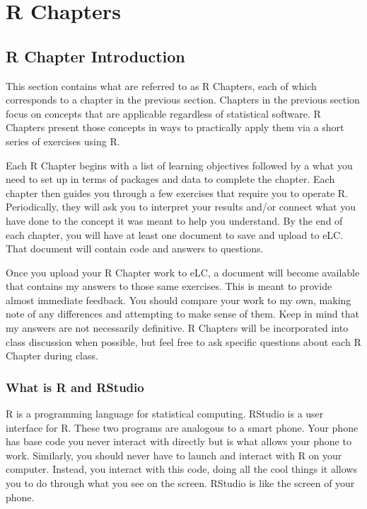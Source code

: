 \documentclass[
]{book}
\begin{document}
\hypertarget{part-r-chapters}{%
\part{R Chapters}\label{part-r-chapters}}

\hypertarget{r-chapter-introduction}{%
\chapter{R Chapter Introduction}\label{r-chapter-introduction}}

This section contains what are referred to as R Chapters, each of which corresponds to a chapter in the previous section. Chapters in the previous section focus on concepts that are applicable regardless of statistical software. R Chapters present those concepts in ways to practically apply them via a short series of exercises using R.

Each R Chapter begins with a list of learning objectives followed by a what you need to set up in terms of packages and data to complete the chapter. Each chapter then guides you through a few exercises that require you to operate R. Periodically, they will ask you to interpret your results and/or connect what you have done to the concept it was meant to help you understand. By the end of each chapter, you will have at least one document to save and upload to eLC. That document will contain code and answers to questions.

Once you upload your R Chapter work to eLC, a document will become available that contains my answers to those same exercises. This is meant to provide almost immediate feedback. You should compare your work to my own, making note of any differences and attempting to make sense of them. Keep in mind that my answers are not necessarily definitive. R Chapters will be incorporated into class discussion when possible, but feel free to ask specific questions about each R Chapter during class.

\hypertarget{what-is-r-and-rstudio}{%
\section{What is R and RStudio}\label{what-is-r-and-rstudio}}

R is a programming language for statistical computing. RStudio is a user interface for R. These two programs are analogous to a smart phone. Your phone has base code you never interact with directly but is what allows your phone to work. Similarly, you should never have to launch and interact with R on your computer. Instead, you interact with this code, doing all the cool things it allows you to do through what you see on the screen. RStudio is like the screen of your phone.
\end{document}
